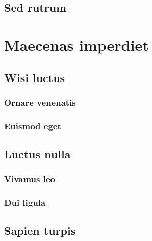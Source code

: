 \subsection{Sed rutrum} \lipsum[11-12]

\section{Maecenas imperdiet} \lipsum[13-14]
\subsection{Wisi luctus} \lipsum[15]
\subsubsection{Ornare venenatis} \lipsum[16]
\subsubsection{Euismod eget} \lipsum[17]
\subsection{Luctus nulla} \lipsum [18]
\subsubsection{Vivamus leo} \lipsum[19]
\subsubsection{Dui ligula} \lipsum[20]
\subsection{Sapien turpis} \lipsum [21-22]
